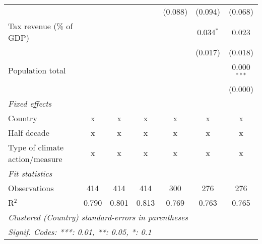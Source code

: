 \begin{tabular}{lcccccc}
                                                    &         &                &                & (0.088)        & (0.094)        & (0.068)\\   
   Tax revenue (\% of GDP)                          &         &                &                &                & 0.034$^{*}$    & 0.023\\   
                                                    &         &                &                &                & (0.017)        & (0.018)\\   
   Population total                                 &         &                &                &                &                & 0.000$^{***}$\\   
                                                    &         &                &                &                &                & (0.000)\\   
   \emph{Fixed effects}\\
   Country                                          & x       & x              & x              & x              & x              & x\\  
   Half decade                                      & x       & x              & x              & x              & x              & x\\  
   Type of climate action/measure                   & x       & x              & x              & x              & x              & x\\  
   \midrule \emph{Fit statistics}\\
   Observations                                     & 414     & 414            & 414            & 300            & 276            & 276\\  
   R$^2$                                            & 0.790   & 0.801          & 0.813          & 0.769          & 0.763          & 0.765\\  
   \midrule
   \multicolumn{7}{l}{\emph{Clustered (Country) standard-errors in parentheses}}\\
   \multicolumn{7}{l}{\emph{Signif. Codes: ***: 0.01, **: 0.05, *: 0.1}}\\
\end{tabular}
\par\endgroup


